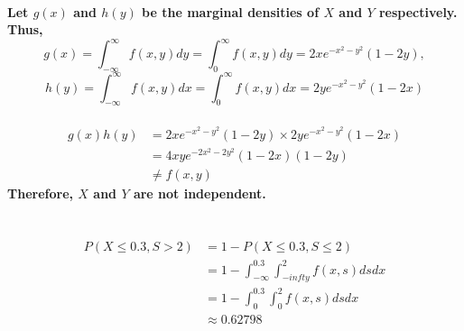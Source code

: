 \documentclass{article}
\begin{document}
        \paragraph{
            Let $g(x)$ and $h(y)$ be the marginal densities of $X$ and $Y$ respectively.
            Thus, 
            $$g(x)=\int _{-\infty} ^\infty f(x,y) dy= \int _0 ^\infty f(x,y) dy=2xe^{-x^2-y^2}(1-2y),$$
            $$h(y)=\int _{-\infty} ^\infty f(x,y) dx= \int _0 ^\infty f(x,y) dx =2ye^{-x^2-y^2}(1-2x)$$
        }
        \paragraph{
            \begin{equation}
                \begin{split}
                    g(x)h(y)
                    &=2xe^{-x^2-y^2}(1-2y)\times 2ye^{-x^2-y^2}(1-2x)\\
                    &=4xye^{-2x^2-2y^2}(1-2x)(1-2y)\\
                    & \neq f(x,y)
                \end{split}
            \end{equation}
            Therefore, $X$ and $Y$ are not independent.
        }
    \section{}
        \subsection{}
            \paragraph{
                \begin{equation}
                    \begin{split}
                        P(X\leq 0.3, S >2)
                        &=1-P(X\leq 0.3 , S \leq 2)\\
                        &=1-\int _{-\infty} ^{0.3} \int _{-infty} ^2 f(x,s) ds dx\\
                        &=1-\int _0 ^{0.3} \int _0 ^2 f(x,s) ds dx\\
                        &\approx 0.62798
                    \end{split}
                \end{equation}
            }
        \subsection{}   
\end{document}
